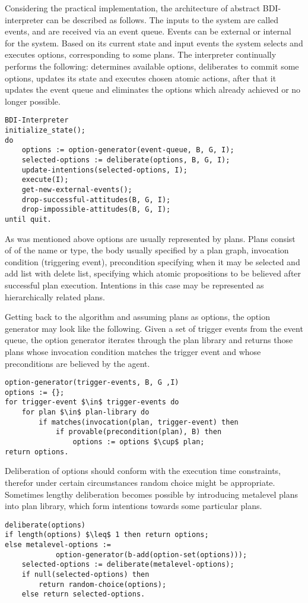 Considering the practical implementation, the architecture of abstract BDI-interpreter can be described as follows. The inputs to the system are called events, and are received via an event queue. Events can be external or internal for the system. Based on its current state and input events the system selects and executes options, corresponding to some plans. The interpreter continually performs the following: determines available options, deliberates to commit some options, updates its state and executes chosen atomic actions, after that it updates the event queue and eliminates the options which already achieved or no longer possible.
%
\begin{lstlisting}
BDI-Interpreter
initialize_state();
do
    options := option-generator(event-queue, B, G, I);
    selected-options := deliberate(options, B, G, I);
    update-intentions(selected-options, I);
    execute(I);
    get-new-external-events();
    drop-successful-attitudes(B, G, I);
    drop-impossible-attitudes(B, G, I);
until quit.
\end{lstlisting}

As was mentioned above options are usually represented by plans. Plans consist of of the name or type, the body usually specified by a plan graph, invocation condition (triggering event), precondition specifying when it may be selected and add list with delete list, specifying which atomic propositions to be believed after successful plan execution. Intentions in this case may be represented as hierarchically related plans.

Getting back to the algorithm and assuming plans as options, the option generator may look like the following.
Given a set of trigger events from the event queue, the option generator iterates through the plan library and returns those plans whose invocation condition
matches the trigger event and whose preconditions are believed by the agent.
%
\begin{lstlisting}[mathescape]
option-generator(trigger-events, B, G ,I)
options := {};
for trigger-event $\in$ trigger-events do
    for plan $\in$ plan-library do
        if matches(invocation(plan, trigger-event) then
            if provable(precondition(plan), B) then
                options := options $\cup$ plan;
return options.
\end{lstlisting}

Deliberation of options should conform with the execution time constraints, therefor under certain circumstances random choice might be appropriate. Sometimes lengthy deliberation becomes possible by introducing metalevel plans into plan library, which form intentions towards some particular plans.
%
\begin{lstlisting}[mathescape]
deliberate(options)
if length(options) $\leq$ 1 then return options;
else metalevel-options :=
            option-generator(b-add(option-set(options)));
    selected-options := deliberate(metalevel-options);
    if null(selected-options) then
        return random-choice(options);
    else return selected-options.
\end{lstlisting}

